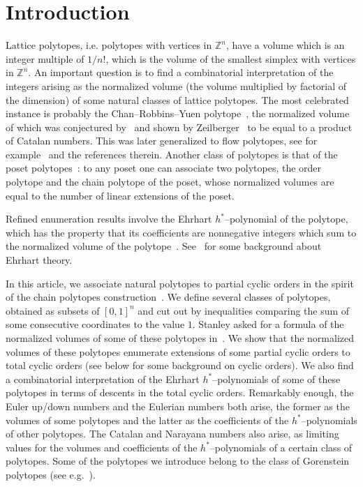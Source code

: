 \documentclass[11pt]{article}
\theoremstyle{definition}
\numberwithin{equation}{section}
\numberwithin{figure}{section}
\numberwithin{table}{section}
\newcommand{\Z}{\mathbb Z}
\newcommand*{\MK}{\mkern 2mu}
\begin{document}
\section{Introduction}\label{sec:introduction}

Lattice polytopes, i.e. polytopes with vertices in $\Z^n$, have a volume which is an integer multiple of $1/n!$, which is the volume of the smallest simplex with vertices in $\Z^n$. An important question is to find a combinatorial interpretation of the integers arising as the normalized volume (the volume multiplied by factorial of the dimension) of some natural classes of lattice polytopes. The most celebrated instance is probably the Chan--Robbins--Yuen polytope~\cite{CRY00}, the normalized volume of which was conjectured by~\cite{CRY00} and shown by Zeilberger~\cite{Z99} to be equal to a product of Catalan numbers. This was later generalized to flow polytopes, see for example~\cite{CKM17} and the references therein. Another class of polytopes is that of the poset polytopes~\cite{S86}: to any poset one can associate two polytopes, the order polytope and the chain polytope of the poset, whose normalized volumes are equal to the number of linear extensions of the poset.

Refined enumeration results involve the Ehrhart $h^*$--polynomial of the polytope, which has the property that its coefficients are nonnegative integers which sum to the normalized volume of the polytope~\cite{S80}. See~\cite{BR15} for some background about Ehrhart theory.

In this article, we associate natural polytopes to partial cyclic orders in the spirit of the chain polytopes construction~\cite{S86}. We define several classes of polytopes, obtained as subsets of $[0,1]^n$ and cut out by inequalities comparing the sum of some consecutive coordinates to the value $1$. Stanley asked for a formula of the normalized volumes of some of these polytopes in~\cite[Exercise~4.56$\MK$(d)]{S12}. We show that the normalized volumes of these polytopes enumerate extensions of some partial cyclic orders to total cyclic orders (see below for some background on cyclic orders). We also find a combinatorial interpretation of the Ehrhart $h^*$--polynomials of some of these polytopes in terms of descents in the total cyclic orders. Remarkably enough, the Euler up/down numbers and the Eulerian numbers both arise, the former as the volumes of some polytopes and the latter as the coefficients of the $h^*$--polynomials of other polytopes. The Catalan and Narayana numbers also arise, as limiting values for the volumes and coefficients of the $h^*$--polynomials of a certain class of polytopes. Some of the polytopes we introduce belong to the class of Gorenstein polytopes (see e.g.~\cite{BN08}).
\end{document}
